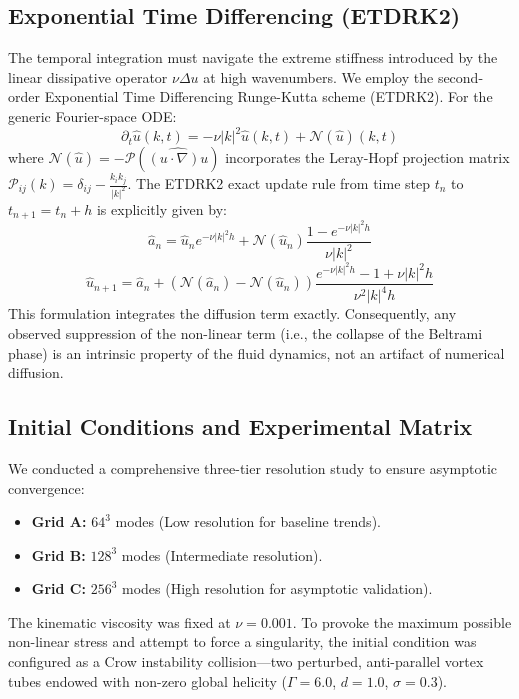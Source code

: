 \documentclass[12pt,a4paper]{article}
\theoremstyle{plain}
\theoremstyle{definition}
\theoremstyle{remark}
\begin{document}
\subsection{Exponential Time Differencing (ETDRK2)}
The temporal integration must navigate the extreme stiffness introduced by the linear dissipative operator $\nu \Delta u$ at high wavenumbers. We employ the second-order Exponential Time Differencing Runge-Kutta scheme (ETDRK2). For the generic Fourier-space ODE:
\begin{equation}
    \partial_t \hat{u}(k, t) = -\nu |k|^2 \hat{u}(k, t) + \mathcal{N}(\hat{u})(k, t)
\end{equation}
where $\mathcal{N}(\hat{u}) = -\mathcal{P} \left( \widehat{(u \cdot \nabla)u} \right)$ incorporates the Leray-Hopf projection matrix $\mathcal{P}_{ij}(k) = \delta_{ij} - \frac{k_i k_j}{|k|^2}$. The ETDRK2 exact update rule from time step $t_n$ to $t_{n+1} = t_n + h$ is explicitly given by:
\begin{equation}
    \hat{a}_n = \hat{u}_n e^{-\nu |k|^2 h} + \mathcal{N}(\hat{u}_n) \frac{1 - e^{-\nu |k|^2 h}}{\nu |k|^2}
\end{equation}
\begin{equation}
    \hat{u}_{n+1} = \hat{a}_n + \left( \mathcal{N}(\hat{a}_n) - \mathcal{N}(\hat{u}_n) \right) \frac{e^{-\nu |k|^2 h} - 1 + \nu |k|^2 h}{\nu^2 |k|^4 h}
\end{equation}
This formulation integrates the diffusion term exactly. Consequently, any observed suppression of the non-linear term (i.e., the collapse of the Beltrami phase) is an intrinsic property of the fluid dynamics, not an artifact of numerical diffusion.

\subsection{Initial Conditions and Experimental Matrix}
We conducted a comprehensive three-tier resolution study to ensure asymptotic convergence:
\begin{itemize}
    \item \textbf{Grid A:} $64^3$ modes (Low resolution for baseline trends).
    \item \textbf{Grid B:} $128^3$ modes (Intermediate resolution).
    \item \textbf{Grid C:} $256^3$ modes (High resolution for asymptotic validation).
\end{itemize}
The kinematic viscosity was fixed at $\nu = 0.001$. To provoke the maximum possible non-linear stress and attempt to force a singularity, the initial condition was configured as a Crow instability collision—two perturbed, anti-parallel vortex tubes endowed with non-zero global helicity ($\Gamma = 6.0$, $d=1.0$, $\sigma=0.3$).
\end{document}
